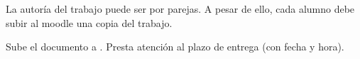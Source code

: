 La autoría del trabajo puede ser por parejas. A pesar de ello, cada alumno debe subir al moodle una copia del trabajo.

Sube el documento a .
Presta atención al plazo de entrega (con fecha y hora).







